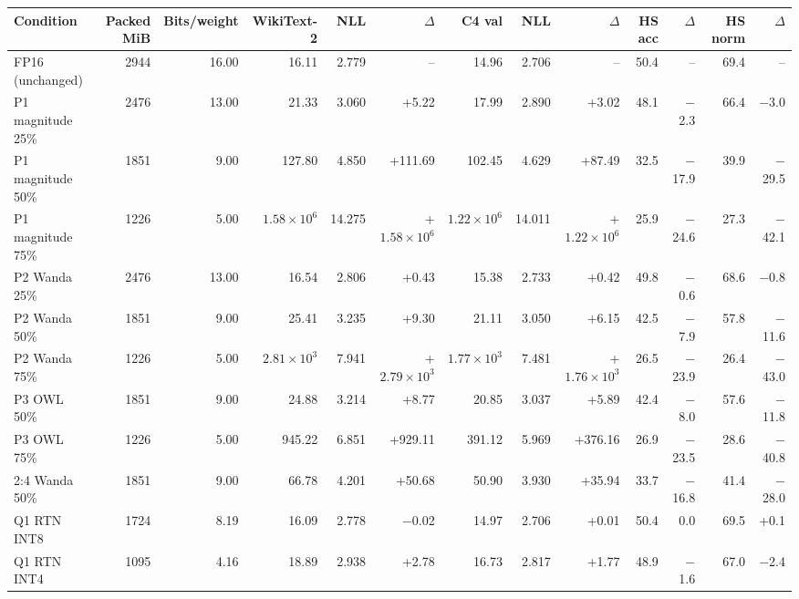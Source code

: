 \scriptsize
\setlength{\tabcolsep}{3.5pt}
\label{tab:t1main}
\begin{adjustbox}{max width=\linewidth}
\begin{tabular}{lrrrrrrrrrrrr}
\toprule
Condition & Packed MiB & Bits/weight & WikiText-2 & NLL & $\Delta$ & C4 val & NLL & $\Delta$ & HS acc & $\Delta$ & HS norm & $\Delta$ \\
\midrule
FP16 (unchanged) & 2944 & 16.00 & 16.11 & 2.779 & -- & 14.96 & 2.706 & -- & 50.4 & -- & 69.4 & -- \\
\midrule
P1 magnitude 25\% & 2476 & 13.00 & 21.33 & 3.060 & +5.22 & 17.99 & 2.890 & +3.02 & 48.1 & $-$2.3 & 66.4 & $-$3.0 \\
P1 magnitude 50\% & 1851 & 9.00 & 127.80 & 4.850 & +111.69 & 102.45 & 4.629 & +87.49 & 32.5 & $-$17.9 & 39.9 & $-$29.5 \\
P1 magnitude 75\% & 1226 & 5.00 & $1.58\times10^{6}$ & 14.275 & +$1.58\times10^{6}$ & $1.22\times10^{6}$ & 14.011 & +$1.22\times10^{6}$ & 25.9 & $-$24.6 & 27.3 & $-$42.1 \\
P2 Wanda 25\% & 2476 & 13.00 & 16.54 & 2.806 & +0.43 & 15.38 & 2.733 & +0.42 & 49.8 & $-$0.6 & 68.6 & $-$0.8 \\
P2 Wanda 50\% & 1851 & 9.00 & 25.41 & 3.235 & +9.30 & 21.11 & 3.050 & +6.15 & 42.5 & $-$7.9 & 57.8 & $-$11.6 \\
P2 Wanda 75\% & 1226 & 5.00 & $2.81\times10^{3}$ & 7.941 & +$2.79\times10^{3}$ & $1.77\times10^{3}$ & 7.481 & +$1.76\times10^{3}$ & 26.5 & $-$23.9 & 26.4 & $-$43.0 \\
P3 OWL 50\% & 1851 & 9.00 & 24.88 & 3.214 & +8.77 & 20.85 & 3.037 & +5.89 & 42.4 & $-$8.0 & 57.6 & $-$11.8 \\
P3 OWL 75\% & 1226 & 5.00 & 945.22 & 6.851 & +929.11 & 391.12 & 5.969 & +376.16 & 26.9 & $-$23.5 & 28.6 & $-$40.8 \\
2:4 Wanda 50\% & 1851 & 9.00 & 66.78 & 4.201 & +50.68 & 50.90 & 3.930 & +35.94 & 33.7 & $-$16.8 & 41.4 & $-$28.0 \\
\midrule
Q1 RTN INT8 & 1724 & 8.19 & 16.09 & 2.778 & $-$0.02 & 14.97 & 2.706 & +0.01 & 50.4 & 0.0 & 69.5 & +0.1 \\
Q1 RTN INT4 & 1095 & 4.16 & 18.89 & 2.938 & +2.78 & 16.73 & 2.817 & +1.77 & 48.9 & $-$1.6 & 67.0 & $-$2.4 \\

\end{tabular}
\end{adjustbox}
